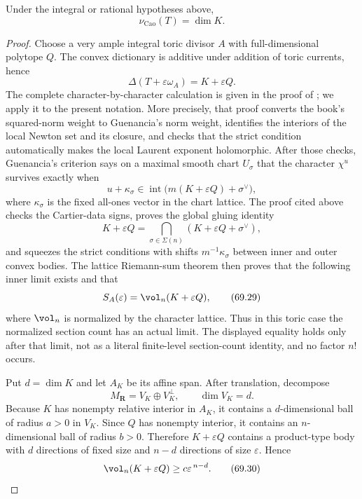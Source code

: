 \begin{theorem}\label{thm:verified-toric-dimension}
Under the integral or rational hypotheses above,
\[
                          \nu_{\mathrm{Cao}}(T)=\dim K.
\tag{69.27}\label{eq:verified-toric-dimension}
\]
\end{theorem}

\begin{proof}
Choose a very ample integral toric divisor \(A\) with full-dimensional
polytope \(Q\). The convex dictionary is additive under addition of
toric currents, hence
\[
               \Delta(T+\varepsilon\omega_A)
                         =K+\varepsilon Q.
\tag{69.28}\label{eq:verified-minkowski-perturbation}
\]
The complete character-by-character calculation is given in the proof of
; we apply it to the present notation.  More
precisely, that proof converts the book's squared-norm weight to
Guenancia's norm weight, identifies the interiors of the local Newton set
and its closure, and checks that the strict condition automatically makes
the local Laurent exponent holomorphic.  After those checks, Guenancia's
criterion \cite[Theorem~1.13]{Guenancia12} says on a maximal smooth chart
\(U_\sigma\) that the character \(\chi^u\) survives exactly when
\[
 u+\kappa_\sigma\in
 \operatorname{int}\bigl(m(K+\varepsilon Q)+\sigma^\vee\bigr),
\]
where \(\kappa_\sigma\) is the fixed all-ones vector in the chart lattice.
The proof cited above checks the Cartier-data signs, proves the global gluing
identity
\[
 K+\varepsilon Q
 =\bigcap_{\sigma\in\Sigma(n)}
   (K+\varepsilon Q+\sigma^\vee),
\]
and squeezes the strict conditions with shifts \(m^{-1}\kappa_\sigma\) between
inner and outer convex bodies.  The lattice Riemann-sum theorem then proves
that the following inner limit exists and that
\[
                         S_A(\varepsilon)
                         =\vol_n(K+\varepsilon Q),
\tag{69.29}\label{eq:verified-toric-rr}
\]
where \(\vol_n\) is normalized by the character lattice.  Thus in this toric
case the normalized section count has an actual limit.  The displayed equality
holds only after that limit, not as a literal finite-level section-count
identity, and no factor \(n!\) occurs.

Put \(d=\dim K\) and let \(A_K\) be its affine span. After translation,
decompose
\[
                  M_{\mathbf R}=V_K\oplus V_K^\perp,
       \qquad \dim V_K=d.
\]
Because \(K\) has nonempty relative interior in \(A_K\), it contains a
\(d\)-dimensional ball of radius \(a>0\) in \(V_K\). Since \(Q\) has
nonempty interior, it contains an \(n\)-dimensional ball of radius
\(b>0\). Therefore \(K+\varepsilon Q\) contains a product-type body
with \(d\) directions of fixed size and \(n-d\) directions of size
\(\varepsilon\). Hence
\[
                \vol_n(K+\varepsilon Q)
                       \geq c\varepsilon^{\,n-d}.
\tag{69.30}\label{eq:verified-volume-lower}
\]


\end{proof}
